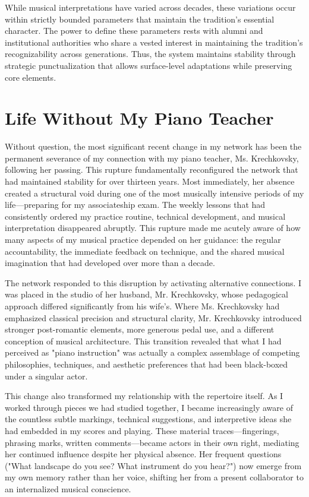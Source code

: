 \documentclass{article} %
\begin{document}
While musical interpretations have varied across decades, these variations occur within strictly bounded parameters that maintain the tradition's essential character. 
The power to define these parameters rests with alumni and institutional authorities who share a vested interest in maintaining the tradition's recognizability across generations. 
Thus, the system maintains stability through strategic punctualization that allows surface-level adaptations while preserving core elements.

\section{Life Without My Piano Teacher}

Without question, the most significant recent change in my network has been the permanent severance of my connection with my piano teacher, Ms. Krechkovsky, following her passing. 
This rupture fundamentally reconfigured the network that had maintained stability for over thirteen years.
Most immediately, her absence created a structural void during one of the most musically intensive periods of my life—preparing for my associateship exam. 
The weekly lessons that had consistently ordered my practice routine, technical development, and musical interpretation disappeared abruptly. 
This rupture made me acutely aware of how many aspects of my musical practice depended on her guidance: the regular accountability, the immediate feedback on technique, and the shared musical imagination that had developed over more than a decade.

The network responded to this disruption by activating alternative connections. 
I was placed in the studio of her husband, Mr. Krechkovsky, whose pedagogical approach differed significantly from his wife's. 
Where Ms. Krechkovsky had emphasized classical precision and structural clarity, Mr. Krechkovsky introduced stronger post-romantic elements, more generous pedal use, and a different conception of musical architecture. 
This transition revealed that what I had perceived as "piano instruction" was actually a complex assemblage of competing philosophies, techniques, and aesthetic preferences that had been black-boxed under a singular actor.

This change also transformed my relationship with the repertoire itself. 
As I worked through pieces we had studied together, I became increasingly aware of the countless subtle markings, technical suggestions, and interpretive ideas she had embedded in my scores and playing. 
These material traces—fingerings, phrasing marks, written comments—became actors in their own right, mediating her continued influence despite her physical absence. 
Her frequent questions ("What landscape do you see? What instrument do you hear?") now emerge from my own memory rather than her voice, shifting her from a present collaborator to an internalized musical conscience.
\end{document}
